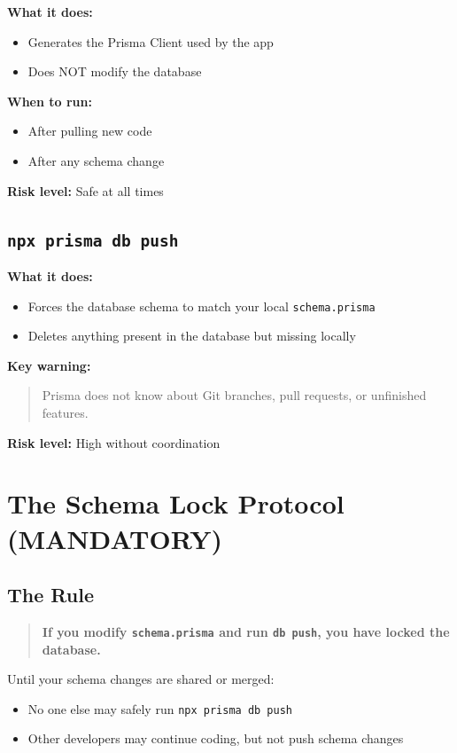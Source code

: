 \documentclass[11pt]{article}
\begin{document}
\textbf{What it does:}
\begin{itemize}
    \item Generates the Prisma Client used by the app
    \item Does NOT modify the database
\end{itemize}

\textbf{When to run:}
\begin{itemize}
    \item After pulling new code
    \item After any schema change
\end{itemize}

\textbf{Risk level:} Safe at all times

\subsection*{\texttt{npx prisma db push}}

\textbf{What it does:}
\begin{itemize}
    \item Forces the database schema to match your local \texttt{schema.prisma}
    \item Deletes anything present in the database but missing locally
\end{itemize}

\textbf{Key warning:}
\begin{quote}
Prisma does not know about Git branches, pull requests, or unfinished features.
\end{quote}

\textbf{Risk level:} High without coordination

\section{The Schema Lock Protocol (MANDATORY)}

\subsection*{The Rule}

\begin{quote}
\textbf{If you modify \texttt{schema.prisma} and run \texttt{db push}, you have locked the database.}
\end{quote}

Until your schema changes are shared or merged:
\begin{itemize}
    \item No one else may safely run \texttt{npx prisma db push}
    \item Other developers may continue coding, but not push schema changes
\end{itemize}
\end{document}
